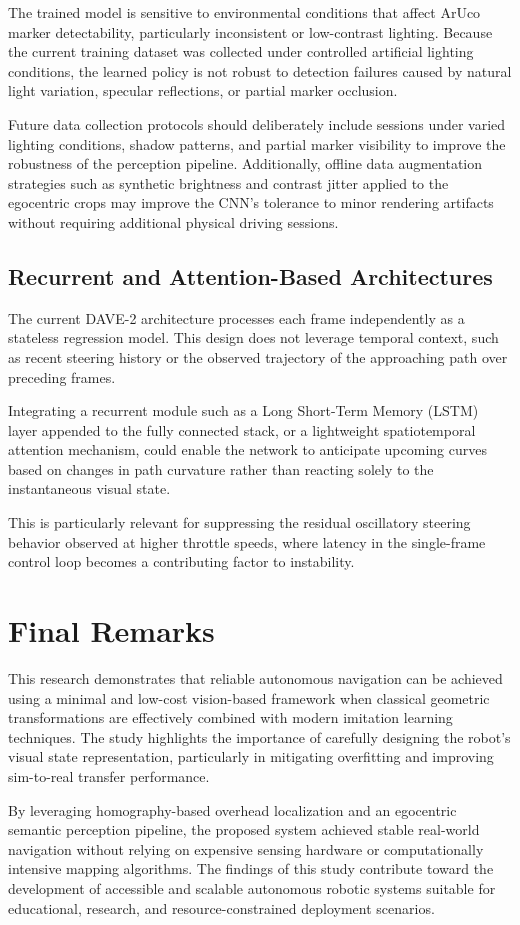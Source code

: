 The trained model is sensitive to environmental conditions that affect ArUco marker detectability, particularly inconsistent or low-contrast lighting. Because the current training dataset was collected under controlled artificial lighting conditions, the learned policy is not robust to detection failures caused by natural light variation, specular reflections, or partial marker occlusion.

Future data collection protocols should deliberately include sessions under varied lighting conditions, shadow patterns, and partial marker visibility to improve the robustness of the perception pipeline. Additionally, offline data augmentation strategies such as synthetic brightness and contrast jitter applied to the egocentric crops may improve the CNN's tolerance to minor rendering artifacts without requiring additional physical driving sessions.

\subsection{Recurrent and Attention-Based Architectures}

The current DAVE-2 architecture processes each frame independently as a stateless regression model. This design does not leverage temporal context, such as recent steering history or the observed trajectory of the approaching path over preceding frames.

Integrating a recurrent module such as a Long Short-Term Memory (LSTM) layer appended to the fully connected stack, or a lightweight spatiotemporal attention mechanism, could enable the network to anticipate upcoming curves based on changes in path curvature rather than reacting solely to the instantaneous visual state.

This is particularly relevant for suppressing the residual oscillatory steering behavior observed at higher throttle speeds, where latency in the single-frame control loop becomes a contributing factor to instability.

\section{Final Remarks}

This research demonstrates that reliable autonomous navigation can be achieved using a minimal and low-cost vision-based framework when classical geometric transformations are effectively combined with modern imitation learning techniques. The study highlights the importance of carefully designing the robot's visual state representation, particularly in mitigating overfitting and improving sim-to-real transfer performance.

By leveraging homography-based overhead localization and an egocentric semantic perception pipeline, the proposed system achieved stable real-world navigation without relying on expensive sensing hardware or computationally intensive mapping algorithms. The findings of this study contribute toward the development of accessible and scalable autonomous robotic systems suitable for educational, research, and resource-constrained deployment scenarios.
